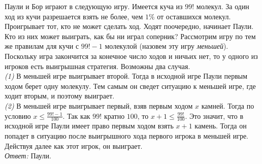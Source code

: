 \problem
Паули и Бор играют в следующую игру.
Имеется куча из $99!$ молекул.
За один ход из кучи разрешается взять не более, чем $1\%$ от оставшихся
молекул.
Проигрывает тот, кто не может сделать ход.
Ходят поочередно, начинает Паули.
Кто из них может выиграть, как бы ни играл соперник?
\solution
Рассмотрим игру по тем же правилам для кучи с $99! - 1$ молекулой
(назовем эту игру \emph{меньшей}).
Поскольку игра закончится за конечное число ходов и ничьих нет, то у одного из
игроков есть выигрышная стратегия.
Возможны два случая.
\\
\emph{(1)}
В меньшей игре выигрывает второй.
Тогда в исходной игре Паули первым ходом берет одну молекулу.
Тем самым он сведет ситуацию к меньшей игре, где ходит вторым, и поэтому
выиграет.
\\
\emph{(2)}
В меньшей игре выигрывает первый, взяв первым ходом $x$ камней.
Тогда по условию $x \leq \frac{99! - 1}{100}$.
Так как $99!$ кратно $100$, то $x + 1 \leq \frac{99!}{100}$.
Это значит, что в исходной игре Паули имеет право первым ходом взять $x + 1$
камень.
Тогда он попадет в ситуацию после выигрышного хода первого игрока в меньшей
игре.
Действуя далее как этот игрок, он выиграет.
\\
\emph{Ответ:} Паули.
\endproblem
